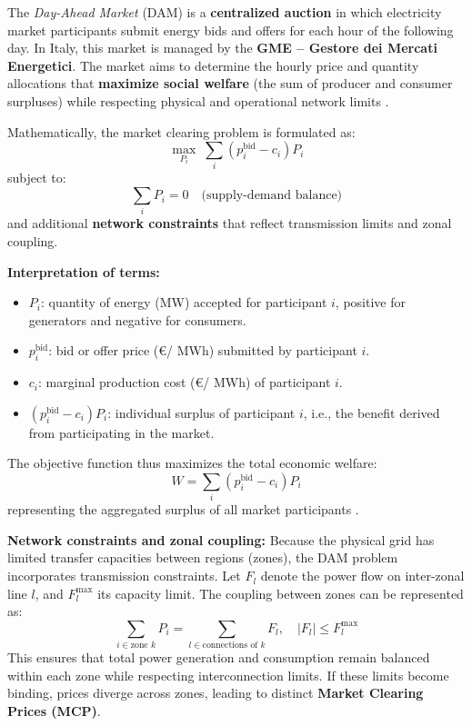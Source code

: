 \documentclass[11pt]{article}
\begin{document}
	The \textit{Day-Ahead Market} (DAM) is a \textbf{centralized auction} in which electricity market participants submit energy bids and offers for each hour of the following day.  
	In Italy, this market is managed by the \textbf{GME – Gestore dei Mercati Energetici}. The market aims to determine the hourly price and quantity allocations that \textbf{maximize social welfare} (the sum of producer and consumer surpluses) while respecting physical and operational network limits \cite{saadat2010power,wood2014power}.
	
	\medskip
	Mathematically, the market clearing problem is formulated as:
	\[
	\max_{P_i} \; \sum_i (p_i^{\text{bid}} - c_i) P_i
	\]
	subject to:
	\[
	\sum_i P_i = 0 \quad \text{(supply-demand balance)}
	\]
	and additional \textbf{network constraints} that reflect transmission limits and zonal coupling.
	
	\medskip
	\noindent\textbf{Interpretation of terms:}
	\begin{itemize}
		\item $P_i$: quantity of energy (MW) accepted for participant $i$, positive for generators and negative for consumers.
		\item $p_i^{\text{bid}}$: bid or offer price (\euro / MWh) submitted by participant $i$.
		\item $c_i$: marginal production cost (\euro / MWh) of participant $i$.
		\item $(p_i^{\text{bid}} - c_i)P_i$: individual surplus of participant $i$, i.e., the benefit derived from participating in the market.
	\end{itemize}
	
	The objective function thus maximizes the total economic welfare:
	\[
	W = \sum_i (p_i^{\text{bid}} - c_i) P_i
	\]
	representing the aggregated surplus of all market participants \cite{grainger1994power}.
	
	\medskip
	\noindent\textbf{Network constraints and zonal coupling:}  
	Because the physical grid has limited transfer capacities between regions (zones), the DAM problem incorporates transmission constraints.  
	Let $F_l$ denote the power flow on inter-zonal line $l$, and $F_l^{\max}$ its capacity limit. The coupling between zones can be represented as:
	\[
	\sum_{i \in \text{zone } k} P_i = \sum_{l \in \text{connections of } k} F_l, \quad |F_l| \le F_l^{\max}
	\]
	This ensures that total power generation and consumption remain balanced within each zone while respecting interconnection limits.  
	If these limits become binding, prices diverge across zones, leading to distinct \textbf{Market Clearing Prices (MCP)}.
	
\end{document}
